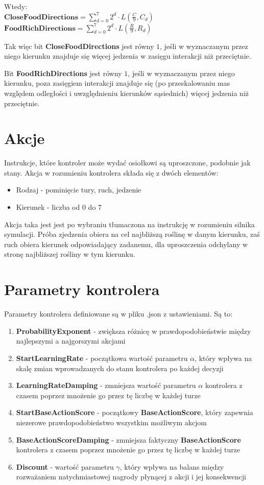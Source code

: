Wtedy:
\\$\textbf{CloseFoodDirections} = \sum_{d=0}^{7} 2^{d} \cdot L(\frac{C}{9},C_{d})$
\\$\textbf{FoodRichDirections} = \sum_{d=0}^{7} 2^{d} \cdot L(\frac{R}{9},R_{d})$

Tak więc bit \textbf{CloseFoodDirections} jest równy $1$, jeśli w wyznaczanym przez niego kierunku znajduje się więcej jedzenia w zasięgu interakcji niż przeciętnie. 

Bit \textbf{FoodRichDirections} jest równy $1$, jeśli w wyznaczanym przez niego kierunku, poza zasięgiem interakcji znajduje się (po przeskalowaniu mas względem odległości i uwzględnieniu kierunków sąsiednich) więcej jedzenia niż przeciętnie.

\section{Akcje}
Instrukcje, które kontroler może wydać osiołkowi są uproszczone, podobnie jak stany. Akcja w rozumieniu kontrolera składa się z dwóch elementów:
\begin{itemize}
    \item Rodzaj - pominięcie tury, ruch, jedzenie
    \item Kierunek - liczba od 0 do 7
\end{itemize}
Akcja taka jest jest po wybraniu tłumaczona na instrukcję w rozumieniu silnika symulacji. Próba zjedzenia obiera na cel najbliższą roślinę w danym kierunku, zaś ruch obiera kierunek odpowiadający zadanemu, dla uproszczenia odchylany w stronę najbliższej rośliny w tym kierunku.

\section{Parametry kontrolera}
Parametry kontrolera definiowane są w pliku .json z ustawieniami. Są to:
\begin{enumerate}
    \item\textbf{ProbabilityExponent} - zwiększa różnicę w prawdopodobieństwie między najlepszymi a najgorszymi akcjami
    \item\textbf{StartLearningRate} - początkowa wartość parametru $\alpha$, który wpływa na skalę zmian wprowadzanych do stanu kontrolera po każdej decyzji
    \item\textbf{LearningRateDamping} - zmniejsza wartość parametru $\alpha$ kontrolera z czasem poprzez mnożenie go przez tę liczbę w każdej turze
    \item\textbf{StartBaseActionScore} - początkowy \textbf{BaseActionScore}, który zapewnia niezerowe prawdopodobieństwo wszystkim możliwym akcjom
    \item\textbf{BaseActionScoreDamping} - zmniejsza faktyczny \textbf{BaseActionScore} kontrolera z czasem poprzez mnożenie go przez tę liczbę w każdej turze
    \item\textbf{Discount} - wartość parametru $\gamma$, który wpływa na balans między rozważaniem natychmiastowej nagrody płynącej z akcji i jej konsekwencji
\end{enumerate}

